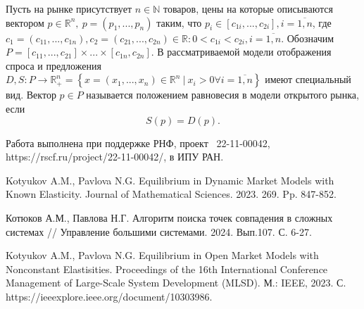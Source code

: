 Пусть на рынке присутствует $n\in\mathbb{N}$ товаров, цены на которые описываются вектором $p\in\mathbb{R}^n, \ p=(p_1,...,p_n)$ таким, что $p_i\in[c_{1i},...,c_{2i}], i =\overline{1,n}$, где $c_1=(c_{11},...,c_{1n}), c_2 = (c_{21},...,c_{2n})\in\mathbb{R}: 0<c_{1i}<c_{2i}, i =\overline{1,n}$. Обозначим $P = [c_{11},...,c_{21}]\times...\times[c_{1n},c_{2n}]$. В рассматриваемой модели отображения спроса и предложения $D,S:P\to\mathbb{R}^n_+ = \left\{x=(x_1,...,x_n)\in\mathbb{R}^n \ | \ x_i > 0 \forall i = \overline{1,n}\right\}$ имеют специальный вид. Вектор $p\in P$ называется положением равновесия в модели открытого рынка, если
$$
S(p) = D(p).
$$



Работа выполнена при поддержке РНФ, проект \textnumero~22-11-00042,  https://rscf.ru/project/22-11-00042/, в ИПУ РАН.
%



\begin{thebibliography}{9} %
 Kotyukov A.M., Pavlova N.G. Equilibrium in Dynamic Market Models with Known Elasticity. Journal of Mathematical Sciences. 2023. 269. Pp. 847-852.

 Котюков А.М., Павлова Н.Г. Алгоритм поиска точек совпадения в сложных системах // Управление большими системами. 2024. Вып.107. С. 6-27.

 Kotyukov A.M., Pavlova N.G. Equilibrium in Open Market Models with Nonconstant Elastisities. Proceedings of the 16th International Conference Management of Large-Scale System Development (MLSD). М.: IEEE, 2023. С. https://ieeexplore.ieee.org/document/10303986.


\end{thebibliography}





%
